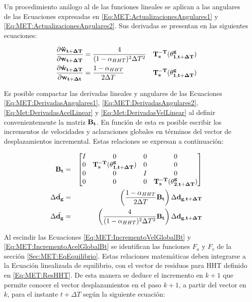 Un procedimiento análogo al de las funciones lineales se aplican a las angulares de las Ecuaciones expresadas en \eqref{Eq:MET:ActualizacionesAngulares1} y \eqref{Eq:MET:ActualizacionesAngulares2}. Sus derivadas se presentan en las siguientes ecuaciones:

\begin{eqnarray}
	\label{Eq:MET:DerivadasAngulares1}
	\frac{\partial \bf{\ddot{w}_{t+\Delta T}}}{\partial \bf{{w}_{t+\Delta T}}}& = 
	\frac{4}{(1-\alpha_{HHT})^2 \Delta T^2}&  \bf{T_s^{-T}}(\bf{\theta^g_{1,{t+\Delta T}}})\\
	\label{Eq:MET:DerivadasAngulares2}
	\frac{\partial \bf{\dot{w}_{t+\Delta T}}}{\partial \bf{{w}_{t+\Delta t}}}& = 
	\frac{1-\alpha_{HHT}}{2\Delta T}& \bf{T_s^{-T}}(\bf{\theta^g_{1,{t+\Delta T}}})
\end{eqnarray}

Es posible compactar las derivadas lineales y angulares de las Ecuaciones \eqref{Eq:MET:DerivadasAngulares1}, \eqref{Eq:MET:DerivadasAngulares2}, \eqref{Eq:Met:DerivadasAcelLinear} y \eqref{Eq:Met:DerivadasVelLinear} al definir convenientemente la matriz $\bf{B_t}$. En función de esta es posible escribir los incrementos de velocidades y aclaraciones globales en términos del vector de desplazamientos incremental. Estas relaciones se expresan a continuación:

\begin{eqnarray}
	\label{Eq:MET:DefBt}
	\bf{B}_t & = & \bf{\begin{bmatrix}
			I& 0 & 0 & 0\\ 
			0 & \bf{T_s^{-T}}(\bf{\theta^g_{1,{t+\Delta T}}}) & 0 & 0\\ 
			0& 0 & I & 0\\ 
			0 & 0 & 0 & \bf{T_s^{-T}}(\bf{\theta^g_{2,{t+\Delta T}}})
	\end{bmatrix}}\\
	\label{Eq:MET:IncrementoVelGlobalBt}
	\Delta \dot{\bf{d_g}}&=& \left(\frac{1-\alpha_{HHT}}{2\Delta T} \bf{B_t}\right) \Delta
	\bf{d_{g,{t+\Delta T}}}\\
	\label{Eq:MET:IncrementoAcelGlobalBt}
	\Delta \ddot{\bf{d_g}}&=& \left( \frac{4}{(1-\alpha_{HHT})^2 \Delta T^2} \bf{B_t} \right)\Delta
	\bf{d_{g,{t+\Delta T}}}
\end{eqnarray}	



Al escindir las Ecuaciones \eqref{Eq:MET:IncrementoVelGlobalBt} y \eqref{Eq:MET:IncrementoAcelGlobalBt} se identifican las funciones $F_a$ y $F_v$ de la sección \ref{Sec:MET:EqEquilibrio}. Estas relaciones matemáticas deben integrarse a la Ecuación linealizada de equilibrio, con el vector de residuos para HHT definido en   \eqref{Eq:MET:ResHHT}. De esta manera se deduce el incremento en $k+1$ que permite conocer el vector desplazamientos en el paso $k+1$, a partir del vector en $k$, para el instante $t+\Delta T$ según la siguiente ecuación: 


